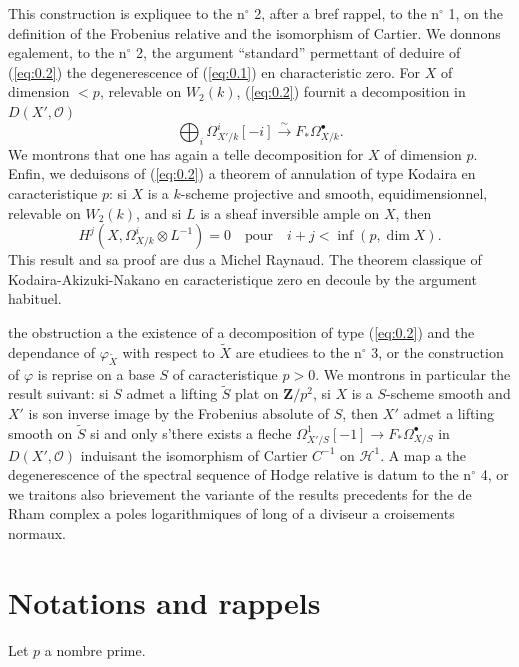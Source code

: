 \documentclass[12pt,a4paper]{article}
\theoremstyle{plain}
\theoremstyle{definition}
\theoremstyle{remark}
\newcommand{\cO}{\mathcal{O}}
\begin{document}
This construction is expliquee to the n$^\circ$ 2, after a bref rappel, to the n$^\circ$ 1, on the
definition of the Frobenius relative and the isomorphism of Cartier. We donnons
egalement, to the n$^\circ$ 2, the argument ``standard'' permettant of deduire of (\ref{eq:0.2}) the
degenerescence of (\ref{eq:0.1}) en characteristic zero. For $X$ of dimension $<p$,
relevable on $W_2(k)$, (\ref{eq:0.2}) fournit a decomposition in $D(X', \cO)$
\begin{equation}\label{eq:0.3}
\bigoplus_i \Omega^i_{X'/k}[-i] \xrightarrow{\sim} F_* \Omega^{\bullet}_{X/k}.
\end{equation}
We montrons that one has again a telle decomposition for $X$ of dimension $p$.
Enfin, we deduisons of (\ref{eq:0.2}) a theorem of annulation of type Kodaira en
caracteristique $p$: si $X$ is a $k$-scheme projective and smooth, equidimensionnel,
relevable on $W_2(k)$, and si $L$ is a sheaf inversible ample on $X$, then
\[
H^j(X, \Omega^i_{X/k} \otimes L^{-1}) = 0 \quad \text{pour} \quad i + j < \inf(p, \dim X).
\]
This result and sa proof are dus a Michel Raynaud. The theorem classique
of Kodaira-Akizuki-Nakano en caracteristique zero en decoule by the argument
habituel.

the obstruction a the existence of a decomposition of type (\ref{eq:0.2}) and the dependance
of $\varphi_{\tilde{X}}$ with respect to $\tilde{X}$ are etudiees to the n$^\circ$ 3, or the construction of $\varphi$ is reprise on
a base $S$ of caracteristique $p > 0$. We montrons in particular the result suivant:
si $S$ admet a lifting $\tilde{S}$ plat on $\mathbf{Z}/p^2$, si $X$ is a $S$-scheme smooth and $X'$ is son
inverse image by the Frobenius absolute of $S$, then $X'$ admet a lifting smooth on
$\tilde{S}$ si and only s'there exists a fleche $\Omega^1_{X'/S}[-1] \to F_* \Omega^{\bullet}_{X/S}$ in $D(X', \cO)$ induisant
the isomorphism of Cartier $C^{-1}$ on $\mathscr{H}^1$. A map a the degenerescence of the
spectral sequence of Hodge relative is datum to the n$^\circ$ 4, or we traitons also
brievement the variante of the results precedents for the de Rham complex a
poles logarithmiques of long of a diviseur a croisements normaux.


\section{Notations and rappels}

Let $p$ a nombre prime.

\subsection{}
\end{document}
